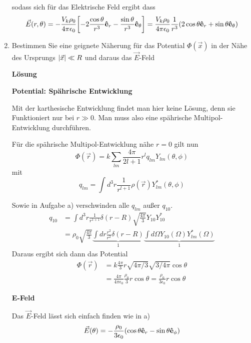\begin{enumerate}[label=\alph*)]
    sodass sich für das Elektrische Feld ergibt dass
    \begin{equation}
      \vec E (r,\theta)= 
      -\frac{V_k\rho_0}{4\pi\epsilon_0}
      \qty[-2 \frac{\cos\theta}{r^3}\vu e_r 
           -\frac{\sin\theta}{r^3}\vu e_\theta]
           = \frac{V_k\rho_0}{4\pi\epsilon_0}\frac{1}{r^3}
           (2\cos\theta \vu e_r + \sin\theta \vu e_\theta)
    \end{equation}

  \item Bestimmen Sie eine geignete Näherung für das Potential 
    $\Phi(\vec x)$ in der Nähe des Ursprungs $\abs{\vec x}\ll R$ und daraus
    das $\vec E$-Feld

    \textbf{Lösung} 
    
    \textbf{Potential: Spährische Entwicklung} 

    Mit der karthesische Entwicklung findet man hier keine Lösung, denn
    sie Funktioniert nur bei $r\gg0$. Man
    muss also eine spährische Multipol-Entwicklung durchführen.

    Für die spährische Multipol-Entwicklung nähe $r=0$ gilt nun
    \begin{equation}
      \Phi(\vec r)=k\sum_{lm}\frac{4\pi}{2l+1}r^lq_{lm}Y_{lm}(\theta,\phi)
    \end{equation}
    mit
    \begin{equation}
      q_{lm}=\int d^3 r \frac{1}{r^{l+1}}\rho(\vec r)Y^*_{lm}(\theta,\phi) 
    \end{equation}

    Sowie in Aufgabe a) verschwinden alle $q_{lm}$ außer $q_{10}$.
    \begin{equation*}
      \begin{split}
        q_{10}
        &=
        \int d^3r \frac{1}{r^{1+1}}\delta(r-R)
        \sqrt{\frac{4\pi}{3}}Y_{10}Y^*_{10} \\
        &= \rho_0 \sqrt{\frac{4\pi}{3}}
        \underbrace{\int dr \frac{r^2}{r^2} \delta(r-R)}_{1}
        \underbrace{\int d\Omega Y_{10}(\Omega)Y^*_{lm}(\Omega)}_{1}
      \end{split}
    \end{equation*}
    Daraus ergibt sich dann das Potential
    \begin{equation}
      \begin{split}
        \Phi(\vec r)
        &=k \frac{4\pi}{3} r \sqrt{4\pi/3} \sqrt{3/4\pi} \cos\theta\\
        &=\frac{4\pi}{4\pi\epsilon_0}\frac{\rho_0}{3}r\cos\theta
        =\frac{\rho_0}{3\epsilon_0}r\cos\theta 
      \end{split}
    \end{equation}

    \textbf{E-Feld}
    
    Das $\vec E$-Feld lässt sich einfach finden wie in a)
    \begin{equation}
      \vec E(\theta) = -\frac{\rho_0}{3\epsilon_0}
      \qty(\cos\theta \vu e_r - \sin\theta \vu e_\phi) 
    \end{equation}
\end{enumerate}

